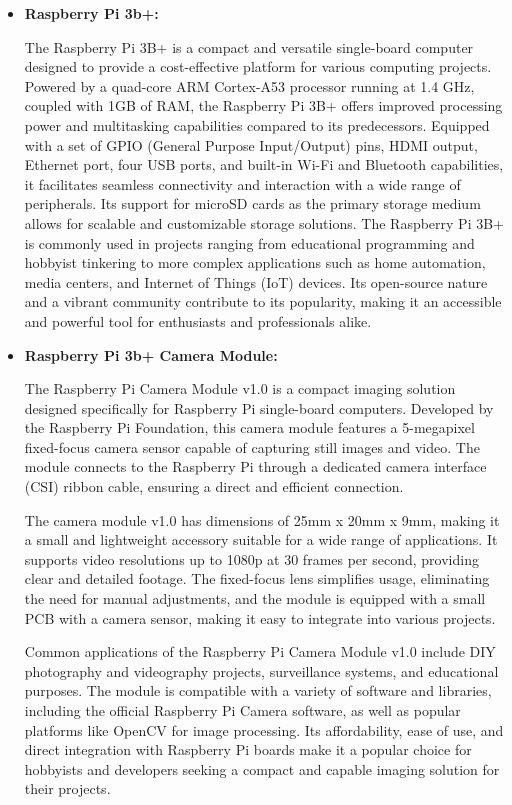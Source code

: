 \documentclass[manuscript]{aastex631}
\begin{document}
\begin{itemize}
    \item \textbf{Raspberry Pi 3b+:}
    
The Raspberry Pi 3B+ is a compact and versatile single-board computer designed to provide a cost-effective platform for various computing projects. Powered by a quad-core ARM Cortex-A53 processor running at 1.4 GHz, coupled with 1GB of RAM, the Raspberry Pi 3B+ offers improved processing power and multitasking capabilities compared to its predecessors. Equipped with a set of GPIO (General Purpose Input/Output) pins, HDMI output, Ethernet port, four USB ports, and built-in Wi-Fi and Bluetooth capabilities, it facilitates seamless connectivity and interaction with a wide range of peripherals. Its support for microSD cards as the primary storage medium allows for scalable and customizable storage solutions. The Raspberry Pi 3B+ is commonly used in projects ranging from educational programming and hobbyist tinkering to more complex applications such as home automation, media centers, and Internet of Things (IoT) devices. Its open-source nature and a vibrant community contribute to its popularity, making it an accessible and powerful tool for enthusiasts and professionals alike.
    
    \item \textbf{Raspberry Pi 3b+ Camera Module:}
    
The Raspberry Pi Camera Module v1.0 is a compact imaging solution designed specifically for Raspberry Pi single-board computers. Developed by the Raspberry Pi Foundation, this camera module features a 5-megapixel fixed-focus camera sensor capable of capturing still images and video. The module connects to the Raspberry Pi through a dedicated camera interface (CSI) ribbon cable, ensuring a direct and efficient connection.

The camera module v1.0 has dimensions of 25mm x 20mm x 9mm, making it a small and lightweight accessory suitable for a wide range of applications. It supports video resolutions up to 1080p at 30 frames per second, providing clear and detailed footage. The fixed-focus lens simplifies usage, eliminating the need for manual adjustments, and the module is equipped with a small PCB with a camera sensor, making it easy to integrate into various projects.

Common applications of the Raspberry Pi Camera Module v1.0 include DIY photography and videography projects, surveillance systems, and educational purposes. The module is compatible with a variety of software and libraries, including the official Raspberry Pi Camera software, as well as popular platforms like OpenCV for image processing. Its affordability, ease of use, and direct integration with Raspberry Pi boards make it a popular choice for hobbyists and developers seeking a compact and capable imaging solution for their projects.
\end{itemize}
\end{document}
